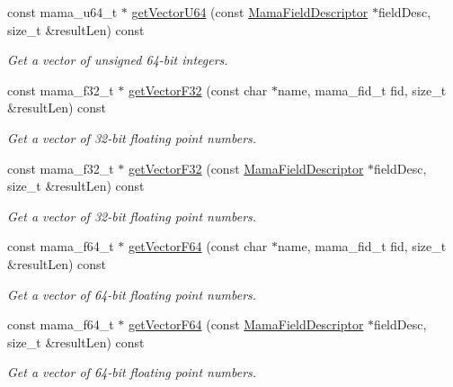 \begin{DoxyCompactItemize}
const mama\_\-u64\_\-t $\ast$ \hyperlink{classWombat_1_1MamaMsg_a162e09dd29b18684ec70b97a580e7644}{getVectorU64} (const \hyperlink{classWombat_1_1MamaFieldDescriptor}{MamaFieldDescriptor} $\ast$fieldDesc, size\_\-t \&resultLen) const 
\begin{DoxyCompactList}\small\item\em Get a vector of unsigned 64-\/bit integers. \item\end{DoxyCompactList}\item 
const mama\_\-f32\_\-t $\ast$ \hyperlink{classWombat_1_1MamaMsg_ac6175d558ea979d95d567935b2b3b9ec}{getVectorF32} (const char $\ast$name, mama\_\-fid\_\-t fid, size\_\-t \&resultLen) const 
\begin{DoxyCompactList}\small\item\em Get a vector of 32-\/bit floating point numbers. \item\end{DoxyCompactList}\item 
const mama\_\-f32\_\-t $\ast$ \hyperlink{classWombat_1_1MamaMsg_aa0069bf80c0f5dedb599f089c04baf35}{getVectorF32} (const \hyperlink{classWombat_1_1MamaFieldDescriptor}{MamaFieldDescriptor} $\ast$fieldDesc, size\_\-t \&resultLen) const 
\begin{DoxyCompactList}\small\item\em Get a vector of 32-\/bit floating point numbers. \item\end{DoxyCompactList}\item 
const mama\_\-f64\_\-t $\ast$ \hyperlink{classWombat_1_1MamaMsg_a28fa6171ad81113b231832a7858fc168}{getVectorF64} (const char $\ast$name, mama\_\-fid\_\-t fid, size\_\-t \&resultLen) const 
\begin{DoxyCompactList}\small\item\em Get a vector of 64-\/bit floating point numbers. \item\end{DoxyCompactList}\item 
const mama\_\-f64\_\-t $\ast$ \hyperlink{classWombat_1_1MamaMsg_a5631c3dc1485076e1e1c45b08147fa6d}{getVectorF64} (const \hyperlink{classWombat_1_1MamaFieldDescriptor}{MamaFieldDescriptor} $\ast$fieldDesc, size\_\-t \&resultLen) const 
\begin{DoxyCompactList}\small\item\em Get a vector of 64-\/bit floating point numbers. \item\end{DoxyCompactList}\item 

\end{DoxyCompactItemize}
